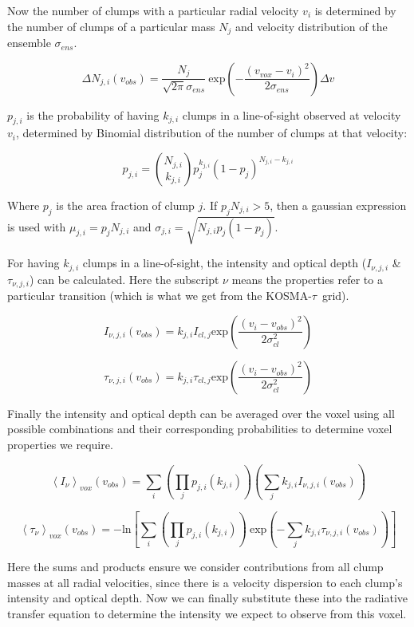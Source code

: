 \documentclass[a4paper]{article}
\newcommand{\kosmatau}{KOSMA-\(\tau\)}
\begin{document}
    Now the number of clumps with a particular radial velocity \(v_i\) is determined by the number of clumps of a particular mass \(N_j\) and velocity distribution of the ensemble \(\sigma_{ens}\).

    \[
    \Delta N_{j,i} (v_{obs}) = \frac{N_j}{\sqrt{2 \pi} \sigma_{ens}} \ \mathrm{exp} \left( -\frac{(v_{vox}-v_i)^2}{2 \sigma_{ens}} \right) \Delta v
    \]

    \(p_{j,i}\) is the probability of having \(k_{j,i}\) clumps in a line-of-sight observed at velocity \(v_i\), determined by Binomial distribution of the number of clumps at that velocity:

    \[
    p_{j,i} = \binom{N_{j,i}}{k_{j,i}} p_j^{k_{j,i}} (1-p_j)^{N_{j,i}-k_{j,i}}
    \]

    Where \(p_j\) is the area fraction of clump \(j\).
    If \(p_j N_{j,i}>5\), then a gaussian expression is used with \(\mu_{j,i} = p_j N_{j,i}\) and \(\sigma_{j,i} = \sqrt{N_{j,i} p_j (1-p_j)}\).

    For having \(k_{j,i}\) clumps in a line-of-sight, the intensity and optical depth (\(I_{\nu,j,i}\) \& \(\tau_{\nu,j,i}\)) can be calculated.
    Here the subscript \(\nu\) means the properties refer to a particular transition (which is what we get from the \kosmatau \ grid).

    \[
    I_{\nu,j,i} (v_{obs}) = k_{j,i} I_{cl,j} \mathrm{exp} \left( \frac{(v_i-v_{obs})^2}{2\sigma_{cl}^2} \right)
    \]

    \[
    \tau_{\nu,j,i} (v_{obs}) = k_{j,i} \tau_{cl,j} \mathrm{exp} \left( \frac{(v_i-v_{obs})^2}{2\sigma_{cl}^2} \right)
    \]

    Finally the intensity and optical depth can be averaged over the voxel using all possible combinations and their corresponding probabilities to determine voxel properties we require.

    \[
    \left< I_\nu \right>_{vox} (v_{obs}) = \sum_i \left( \prod_j p_{j,i}(k_{j,i}) \right) \left( \sum_j k_{j,i} I_{\nu,j,i} (v_{obs}) \right)
    \]

    \[
    \left< \tau_\nu \right>_{vox} (v_{obs}) = -\mathrm{ln} \left[ \sum_i \left( \prod_j p_{j,i}(k_{j,i}) \right) \ \mathrm{exp} \left( - \sum_j k_{j,i} \tau_{\nu,j,i} (v_{obs}) \right) \right]
    \]

    Here the sums and products ensure we consider contributions from all clump masses at all radial velocities, since there is a velocity dispersion to each clump's intensity and optical depth.
    Now we can finally substitute these into the radiative transfer equation to determine the intensity we expect to observe from this voxel.
\end{document}
